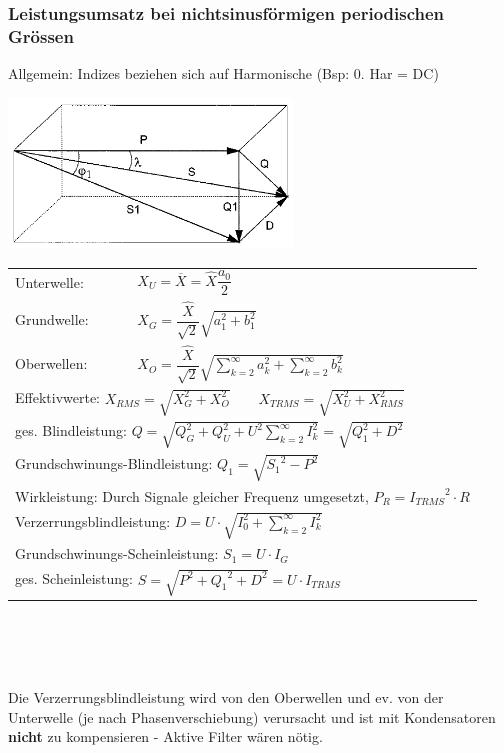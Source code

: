 		\subsubsection{Leistungsumsatz bei nichtsinusf\"ormigen periodischen Gr\"ossen}
		\begin{minipage}[c]{7.5cm}
			\parbox{4cm}{Allgemein: Indizes beziehen sich auf Harmonische (Bsp: 0. Har = DC)\\}
			\includegraphics[height=4cm]{bilder/ZeigerdiagrammNichtSinus.png}     
    	\end{minipage}
		\begin{minipage}[c]{10.5cm}   
    		\noindent
    		\renewcommand{\arraystretch}{2.5}
    		\begin{tabular}{p{1.8cm} p{5.6cm}}
        		Unterwelle: 
        			& $X_{U} = \overline{X} = \hat{X}\dfrac{a_0}{2}  \qquad $  \\
	     		Grundwelle: 
	     			& $X_{G} = \dfrac{\hat{X}}{\sqrt{2}} \sqrt{a_1^2 + b_1^2} \qquad  $   \\
	     		Oberwellen: 
	     			& $X_{O} = \dfrac{\hat{X}}{\sqrt{2}}
	     			\sqrt{\sum\limits_{k=2}^{\infty}a_k^2 +\sum\limits_{k=2}^{\infty}b_k^2}
	     			\qquad $  \\ 
	     		\multicolumn{2}{l}{Effektivwerte: $X_{RMS} = \sqrt{X_G^2 + X_O^2} \qquad X_{TRMS} =
	     			\sqrt{X_U^2 + X_{RMS}^2}$ } \\
				\multicolumn{2}{l}{ges. Blindleistung: 
					$Q = 	\sqrt{Q_G^2 + Q_U^2 + U^2 \sum\limits_{k=2}^{\infty}I_k^2} = \sqrt{Q_1^2 + D^2}$} \\ 
				\multicolumn{2}{l}{Grundschwinungs-Blindleistung: 
					$Q_1 = \sqrt{{S_1}^2 - P^2}$} \\
				\multicolumn{2}{l}{Wirkleistung: 
					Durch Signale gleicher Frequenz umgesetzt, $P_R = {I_{TRMS}}^2 \cdot R$} \\
				\multicolumn{2}{l}{Verzerrungsblindleistung: 
					$D = U \cdot \sqrt{I_0^2 + \sum\limits_{k=2}^{\infty}I_k^2}$} \\
				\multicolumn{2}{l}{Grundschwinungs-Scheinleistung: 
					$S_1 = U \cdot I_G$} \\
				\multicolumn{2}{l}{ges. Scheinleistung: 
					$S = \sqrt{P^2 + {Q_1}^2 + D^2} = U \cdot I_{TRMS}$} \\
		 	\end{tabular} \\
		 \renewcommand{\arraystretch}{1}
     	\end{minipage}    		\\ \\
     	Die Verzerrungsblindleistung wird von den Oberwellen und ev. von der Unterwelle (je
     	nach Phasenverschiebung) verursacht und ist mit Kondensatoren \textbf{nicht} zu kompensieren -
     	Aktive Filter w\"aren n\"otig.
		\\		
		
